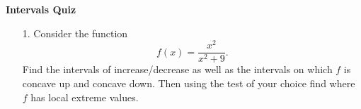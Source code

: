 \documentclass[11pt]{article}
\begin{document}

\centerline{\textbf{\Large{Intervals Quiz}}}

\vspace{0.2in}
 

\begin{enumerate}

	\item[1.] Consider the function $$f(x) = \frac{x^2}{x^2 + 9}.$$ Find the intervals of increase/decrease as well as the intervals on which $f$ is concave up and concave down. Then using the test of your choice find where $f$ has local extreme values. 
\end{enumerate}
 
\end{document}
